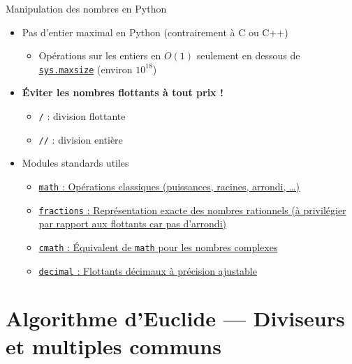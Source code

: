 \documentclass{main}
\begin{document}
\begin{frame}{Manipulation des nombres en Python}
    \begin{itemize}
        \item Pas d’entier maximal en Python (contrairement à C ou C++)
        \begin{itemize}
            \item Opérations sur les entiers en $O(1)$ seulement en dessous de \href{https://docs.python.org/3/library/sys.html\#sys.maxsize}{\texttt{sys.maxsize}} (environ $10^{18}$)
        \end{itemize}
        \item \textbf{Éviter les nombres flottants à tout prix !}
        \begin{itemize}
            \item \texttt{/} : division flottante
            \item \texttt{//} : division entière
        \end{itemize}
        \item Modules standards utiles
        \begin{itemize}
            \item \href{https://docs.python.org/3/library/math.html}{\texttt{math} : Opérations classiques (puissances, racines, arrondi, …)}
            \item \href{https://docs.python.org/3/library/fractions.html}{\texttt{fractions} : Représentation exacte des nombres rationnels (à privilégier par rapport aux flottants car pas d’arrondi)}
            \item \href{https://docs.python.org/3/library/cmath.html}{\texttt{cmath} : Équivalent de \texttt{math} pour les nombres complexes}
            \item \href{https://docs.python.org/3/library/decimal.html}{\texttt{decimal} : Flottants décimaux à précision ajustable}
        \end{itemize}
    \end{itemize}
\end{frame}

\section{Algorithme d’Euclide --- Diviseurs et multiples communs}
\maketoc
\end{document}
